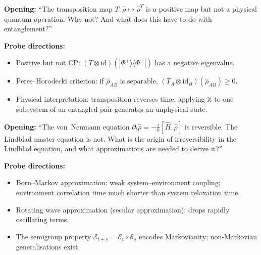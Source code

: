 \documentclass[11pt,a4paper]{article}
\begin{document}
\bigskip

\begin{tcolorbox}[researchbox, title={ORQ 3 --- Complete Positivity}]

\textbf{Opening:}
``The transposition map $T:\hat{\rho}\mapsto\hat{\rho}^T$ is a positive map
but not a physical quantum operation. Why not? And what does this have to do
with entanglement?''

\medskip\textbf{Probe directions:}
\begin{itemize}[leftmargin=1.5em, itemsep=3pt]
  \item Positive but not CP: $(T\otimes\mathrm{id})(|\Phi^+\rangle\langle\Phi^+|)$
        has a negative eigenvalue.
  \item Peres--Horodecki criterion: if $\hat{\rho}_{AB}$ is separable,
        $(T_A\otimes\mathrm{id}_B)(\hat{\rho}_{AB})\ge 0$.
  \item Physical interpretation: transposition reverses time; applying it to
        one subsystem of an entangled pair generates an unphysical state.
\end{itemize}
\end{tcolorbox}

\bigskip

\begin{tcolorbox}[researchbox, title={ORQ 4 --- GKSL and Irreversibility}]

\textbf{Opening:}
``The von~Neumann equation $\partial_t\hat{\rho}=-\tfrac{i}{\hbar}[\hat{H},\hat{\rho}]$
is reversible. The Lindblad master equation is not. What is the origin of
irreversibility in the Lindblad equation, and what approximations are needed
to derive it?''

\medskip\textbf{Probe directions:}
\begin{itemize}[leftmargin=1.5em, itemsep=3pt]
  \item Born--Markov approximation: weak system--environment coupling;
        environment correlation time much shorter than system relaxation time.
  \item Rotating wave approximation (secular approximation): drops rapidly oscillating terms.
  \item The semigroup property $\mathcal{E}_{t+s}=\mathcal{E}_t\circ\mathcal{E}_s$
        encodes Markovianity; non-Markovian generalisations exist.
\end{itemize}
\end{tcolorbox}
\end{document}

